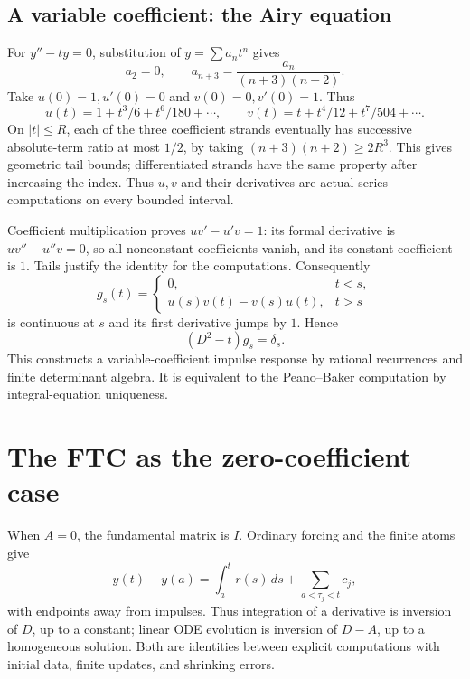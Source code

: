 \subsection{A variable coefficient: the Airy equation}
For $y''-ty=0$, substitution of $y=\sum a_nt^n$ gives
\[
 a_2=0,\qquad a_{n+3}=\frac{a_n}{(n+3)(n+2)}.
\]
Take $u(0)=1,u'(0)=0$ and $v(0)=0,v'(0)=1$.  Thus
\[
 u(t)=1+t^3/6+t^6/180+\cdots,\qquad
 v(t)=t+t^4/12+t^7/504+\cdots.
\]
On $|t|\le R$, each of the three coefficient strands eventually has
successive absolute-term ratio at most $1/2$, by taking
$(n+3)(n+2)\ge2R^3$.  This gives geometric tail bounds; differentiated
strands have the same property after increasing the index.  Thus $u,v$
and their derivatives are actual series computations on every bounded
interval.

Coefficient multiplication proves $uv'-u'v=1$: its formal derivative is
$uv''-u''v=0$, so all nonconstant coefficients vanish, and its constant
coefficient is $1$.  Tails justify the identity for the computations.
Consequently
\[
 g_s(t)=\begin{cases}
 0,&t<s,\\
 u(s)v(t)-v(s)u(t),&t>s
 \end{cases}
\]
is continuous at $s$ and its first derivative jumps by $1$.  Hence
\[
 (D^2-t)g_s=\delta_s.
\]
This constructs a variable-coefficient impulse response by rational
recurrences and finite determinant algebra.  It is equivalent to the
Peano--Baker computation by integral-equation uniqueness.

\section{The FTC as the zero-coefficient case}
When $A=0$, the fundamental matrix is $I$.  Ordinary forcing and the
finite atoms give
\[
 y(t)-y(a)=\int_a^t r(s)\,ds+\sum_{a<\tau_j<t}c_j,
\]
with endpoints away from impulses.  Thus integration of a derivative is
inversion of $D$, up to a constant; linear ODE evolution is inversion of
$D-A$, up to a homogeneous solution.  Both are identities between explicit
computations with initial data, finite updates, and shrinking errors.
